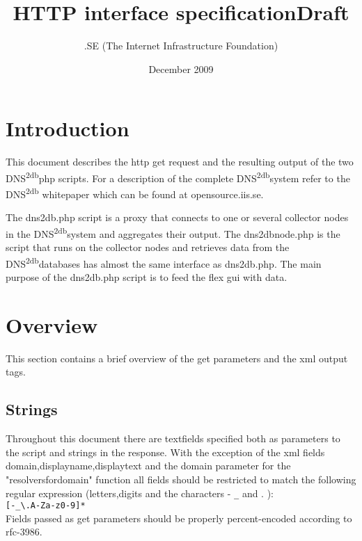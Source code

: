 \documentclass[a4paper]{article}
\title{\dnsdb \linebreak\linebreak HTTP interface specification\linebreak \textbf{Draft} }
\author{\linebreak.SE (The Internet Infrastructure Foundation)}
\date{December 2009}
\newcommand{\dnsdb}{DNS\textsuperscript{2db}}
\begin{document}
\maketitle
\newpage

\tableofcontents
\newpage

\section{Introduction}
This document describes the http get request and the resulting output of 
the two \dnsdb \hspace{3pt}php scripts. For a description of the complete \dnsdb \hspace{3pt}system refer to the \dnsdb 
whitepaper which can be found at opensource.iis.se.

The dns2db.php script is a proxy that connects to one or several collector 
nodes in the \dnsdb  system and aggregates their output. 
The dns2dbnode.php is the script that runs on the collector nodes and retrieves data 
from the \dnsdb databases has almost the same interface as dns2db.php. 
The main purpose of the dns2db.php script is to feed the flex gui with data.


\section{Overview}

This section contains a brief overview of the get parameters and the 
xml output tags.

\subsection{Strings}
Throughout this document there are textfields specified both as 
parameters to the script and strings in the response.
With the exception of the xml fields domain,displayname,displaytext 
and the domain parameter for the "resolversfordomain" function
all fields should be restricted to match the following regular expression
 (letters,digits and the characters - \verb#_# and . ):\\

\verb#[-_\.A-Za-z0-9]*#\\

Fields passed as get parameters should be properly percent-encoded according to
rfc-3986.
\end{document}
